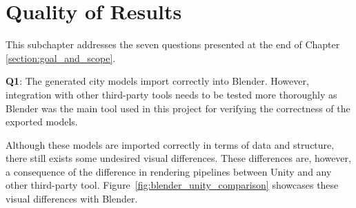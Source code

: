 \section{Quality of Results}

This subchapter addresses the seven questions presented at the end of Chapter \ref{section:goal_and_scope}.

\textbf{Q1}:
The generated city models import correctly into Blender.
However, integration with other third-party tools needs to be tested more thoroughly as Blender was the main tool used in this project for verifying the correctness of the exported models.

Although these models are imported correctly in terms of data and structure, there still exists some undesired visual differences.
These differences are, however, a consequence of the difference in rendering pipelines between Unity and any other third-party tool.
Figure~\ref{fig:blender_unity_comparison} showcases these visual differences with Blender.


